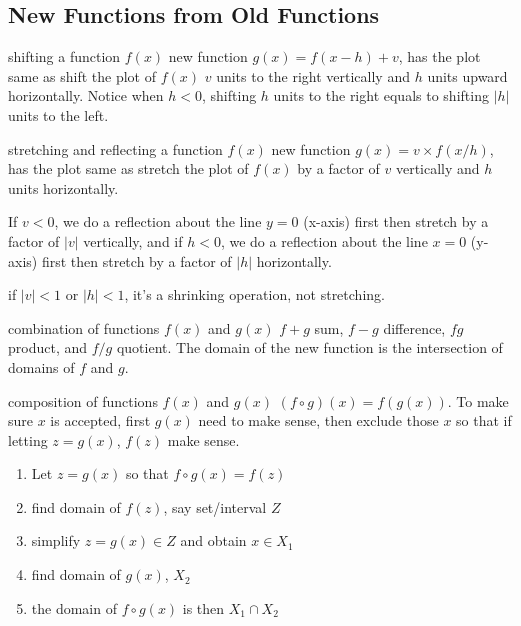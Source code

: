 \documentclass[Calculus 1 Recitation.tex]{subfiles}
\begin{document}
\subsection{New Functions from Old Functions}

\begin{myleftlinebox}
	shifting a function $f(x)$
	\tcblower
	new function $g(x) = f(x-h)+v$, has the plot same as shift the plot of $f(x)$ $v$ units to the right vertically and $h$ units upward horizontally. Notice when $h<0$, shifting $h$ units to the right equals to shifting $|h|$ units to the left.
\end{myleftlinebox}

\begin{myleftlinebox}
	stretching and reflecting a function $f(x)$
	\tcblower
	new function $g(x) = v\times f(x/h)$, has the plot same as stretch the plot of $f(x)$ by a factor of $v$ vertically and $h$ units horizontally. 
	
	If $v<0$, we do a reflection about the line $y=0$ (x-axis) first then stretch by a factor of $|v|$ vertically, and if $h<0$, we do a reflection about the line $x=0$ (y-axis) first then stretch by a factor of $|h|$ horizontally.
	
	if $|v|<1$ or $|h|<1$, it's a shrinking operation, not stretching.
\end{myleftlinebox}


\begin{myleftlinebox}
	combination of functions $f(x)$ and $g(x)$
	\tcblower
	$f+g$ sum, $f-g$ difference, $fg$ product, and $f/g$ quotient. The domain of the new function is the intersection of domains of $f$ and $g$.
\end{myleftlinebox}

\begin{myleftlinebox}
	composition of functions $f(x)$ and $g(x)$
	\tcblower
	$(f\circ g)(x) = f(g(x))$. To make sure $x$ is accepted, first $g(x)$ need to make sense, then exclude those $x$ so that if letting $z=g(x)$, $f(z)$ make sense.
	\begin{enumerate}
		\item Let $z=g(x)$ so that $f\circ g(x) = f(z)$
		\item find domain of $f(z)$, say set/interval $Z$
		\item simplify $z=g(x)\in Z$ and obtain $x\in X_1$
		\item find domain of $g(x)$, $X_2$
		\item the domain of $f\circ g(x)$ is then $X_1\cap X_2$
	\end{enumerate}
\end{myleftlinebox}
\end{document}
